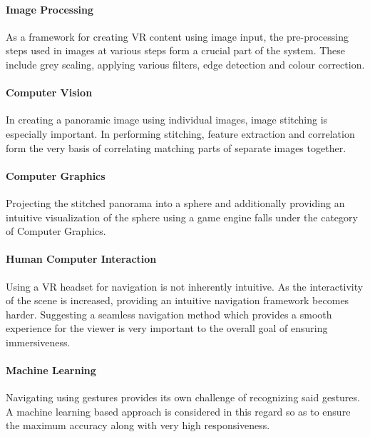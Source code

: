 \paragraph{\textbf{Image Processing}}
As a framework for creating VR content using image input, the pre-processing steps used in images at various steps form a crucial part of the system. These include grey scaling, applying various filters, edge detection and colour correction.

\paragraph{\textbf{Computer Vision}}
In creating a panoramic image using individual images, image stitching is especially important. In performing stitching, feature extraction and correlation form the very basis of correlating matching parts of separate images together.

\paragraph{\textbf{Computer Graphics}}
Projecting the stitched panorama into a sphere and additionally providing an intuitive visualization of the sphere using a game engine falls under the category of Computer Graphics.

\paragraph{\textbf{Human Computer Interaction}}
Using a VR headset for navigation is not inherently intuitive. As the interactivity of the scene is increased, providing an intuitive navigation framework becomes harder. Suggesting a seamless navigation method which provides a smooth experience for the viewer is very important to the overall goal of ensuring immersiveness.

\paragraph{\textbf{Machine Learning}}
Navigating using gestures provides its own challenge of recognizing said gestures. A machine learning based approach is considered in this regard so as to ensure the maximum accuracy along with very high responsiveness.
